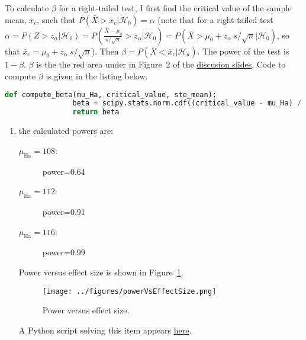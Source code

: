 \documentclass[12pt]{article}
\begin{document}
\begin{enumerate}
        To calculate $\beta$ for a right-tailed test, I first find the critical value of the sample
        mean, $\bar{x}_c$, such that
        $P(\bar{X}>\bar{x}_c|\mathcal{H}_0)=\alpha$ (note that for a
        right-tailed test
        $\alpha=P(Z>z_\alpha|\mathcal{H}_0)=P(\frac{\bar{X}-\mu_0}{s/\sqrt{n}}>z_\alpha|\mathcal{H}_0)=P(\bar{X}>\mu_0+z_\alpha\ s/\sqrt{n}|\mathcal{H}_0)$, so that $\bar{x}_c=\mu_0+z_\alpha\ s/\sqrt{n}$).
        Then $\beta=P(\bar{X}<\bar{x}_c|\mathcal{H}_a)$. The power of the test
        is $1-\beta$. $\beta$ is the the red area under in Figure~2 of the
        \href{https://github.com/joacorapela/neuroinformatics24/blob/master/practicals/01_tTestAndRandomizationTests/introAndHipothesisTests.pdf}{discusion
        slides}. Code to compute $\beta$ is given in the listing below.

        \begin{lstlisting}[language=Python]
            def compute_beta(mu_Ha, critical_value, ste_mean):
                beta = scipy.stats.norm.cdf((critical_value - mu_Ha) / ste_mean)
                return beta
        \end{lstlisting}

        \begin{enumerate}
            \item the calculated powers are:
                \begin{description}
                    \item[$\mu_\text{Ha}=108$:] power=0.64
                    \item[$\mu_\text{Ha}=112$:] power=0.91
                    \item[$\mu_\text{Ha}=116$:] power=0.99
                \end{description}

                Power versus effect size is shown in
                Figure~\ref{fig:powerVsEffectSize}.

                \begin{figure}
                    \begin{center}
                        \texttt{[image: ../figures/powerVsEffectSize.png]}
                    \end{center}
                    \caption{Power versus effect size.}
                    \label{fig:powerVsEffectSize}
                \end{figure}

                A Python script solving this item appears
                \href{https://github.com/joacorapela/neuroinformatics24/blob/master/worksheets/01_tTestAndRandomizationTests/mySolution/code/doPowerExa.py}{here}.


\end{enumerate}
\end{enumerate}
\end{document}
